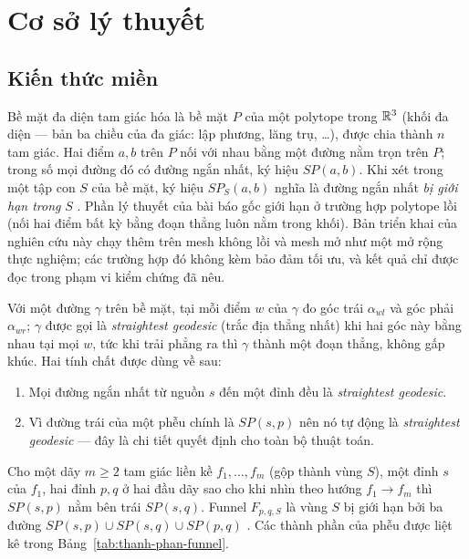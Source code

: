 
\section{Cơ sở lý thuyết}\label{sec:theory}

\subsection{Kiến thức miền}

Bề mặt đa diện tam giác hóa là bề mặt $P$ của một polytope trong $\mathbb{R}^3$ (khối đa
diện --- bản ba chiều của đa giác: lập phương, lăng trụ, \ldots), được chia thành
$n$ tam giác. Hai điểm $a,b$ trên $P$ nối với nhau bằng một đường nằm trọn trên
$P$; trong số mọi đường đó có đường ngắn nhất, ký hiệu $SP(a,b)$. Khi xét trong
một tập con $S$ của bề mặt, ký hiệu $SP_S(a,b)$ nghĩa là đường ngắn nhất
\emph{bị giới hạn trong} $S$ \cite{an2024funnel}. Phần lý thuyết của bài báo
gốc giới hạn ở trường hợp polytope lồi (nối hai điểm bất kỳ bằng đoạn thẳng luôn
nằm trong khối). Bản triển khai của nghiên cứu này chạy thêm trên mesh không lồi
và mesh mở như một mở rộng thực nghiệm; các trường hợp đó không kèm bảo đảm tối
ưu, và kết quả chỉ được đọc trong phạm vi kiểm chứng đã nêu.

Với một đường $\gamma$ trên bề mặt, tại mỗi điểm $w$ của $\gamma$ đo góc trái
$\alpha_{wl}$ và góc phải $\alpha_{wr}$; $\gamma$ được gọi là \emph{straightest
geodesic} (trắc địa thẳng nhất) khi hai góc này bằng nhau tại mọi $w$, tức khi
trải phẳng ra thì $\gamma$ thành một đoạn thẳng, không gấp khúc. Hai tính chất
được dùng về sau:
\begin{enumerate}
  \item Mọi đường ngắn nhất từ nguồn $s$ đến một đỉnh đều là \emph{straightest
    geodesic}.
  \item Vì đường trái của một phễu chính là $SP(s,p)$ nên nó tự động là
    \emph{straightest geodesic} --- đây là chi tiết quyết định cho toàn bộ thuật
    toán.
\end{enumerate}

Cho một dãy $m\ge 2$ tam giác liền kề $f_1,\ldots,f_m$ (gộp thành vùng $S$), một
đỉnh $s$ của $f_1$, hai đỉnh $p,q$ ở hai đầu dãy sao cho khi nhìn theo hướng
$f_1\to f_m$ thì $SP(s,p)$ nằm bên trái $SP(s,q)$. Funnel $F_{p,q,S}$ là vùng $S$
bị giới hạn bởi ba đường $SP(s,p)\cup SP(s,q)\cup SP(p,q)$ \cite{an2024funnel}.
Các thành phần của phễu được liệt kê trong Bảng~\ref{tab:thanh-phan-funnel}.

